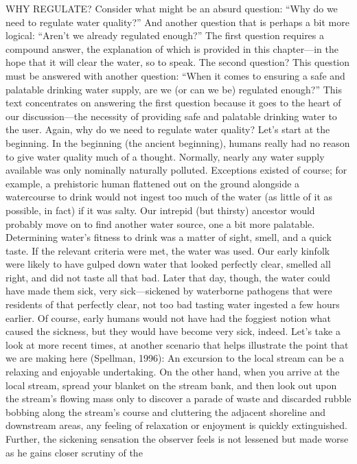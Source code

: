 \documentclass{article}
\begin{document}
WHY REGULATE? Consider what might be an absurd question: ``Why do we
need to regulate water quality?'' And another question that is perhaps a
bit more logical: ``Aren't we already regulated enough?'' The first
question requires a compound answer, the explanation of which is
provided in this chapter---in the hope that it will clear the water, so
to speak. The second question? This question must be answered with
another question: ``When it comes to ensuring a safe and palatable
drinking water supply, are we (or can we be) regulated enough?'' This
text concentrates on answering the first question because it goes to the
heart of our discussion---the necessity of providing safe and palatable
drinking water to the user. Again, why do we need to regulate water
quality? Let's start at the beginning. In the beginning (the ancient
beginning), humans really had no reason to give water quality much of a
thought. Normally, nearly any water supply available was only nominally
naturally polluted. Exceptions existed of course; for example, a
prehistoric human flattened out on the ground alongside a watercourse to
drink would not ingest too much of the water (as little of it as
possible, in fact) if it was salty. Our intrepid (but thirsty) ancestor
would probably move on to find another water source, one a bit more
palatable. Determining water's fitness to drink was a matter of sight,
smell, and a quick taste. If the relevant criteria were met, the water
was used. Our early kinfolk were likely to have gulped down water that
looked perfectly clear, smelled all right, and did not taste all that
bad. Later that day, though, the water could have made them sick, very
sick---sickened by waterborne pathogens that were residents of that
perfectly clear, not too bad tasting water ingested a few hours earlier.
Of course, early humans would not have had the foggiest notion what
caused the sickness, but they would have become very sick, indeed. Let's
take a look at more recent times, at another scenario that helps
illustrate the point that we are making here (Spellman, 1996): An
excursion to the local stream can be a relaxing and enjoyable
undertaking. On the other hand, when you arrive at the local stream,
spread your blanket on the stream bank, and then look out upon the
stream's flowing mass only to discover a parade of waste and discarded
rubble bobbing along the stream's course and cluttering the adjacent
shoreline and downstream areas, any feeling of relaxation or enjoyment
is quickly extinguished. Further, the sickening sensation the observer
feels is not lessened but made worse as he gains closer scrutiny of the
\end{document}
